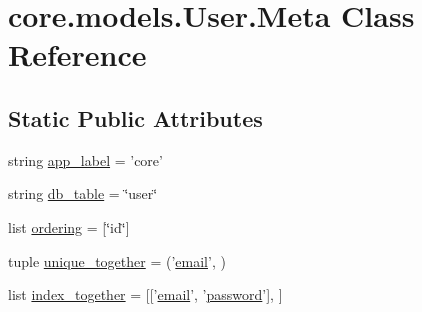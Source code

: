 \hypertarget{classcore_1_1models_1_1User_1_1Meta}{\section{core.\-models.\-User.\-Meta Class Reference}
\label{classcore_1_1models_1_1User_1_1Meta}
}
\subsection*{Static Public Attributes}
\begin{DoxyCompactItemize}
\item 
string \hyperlink{classcore_1_1models_1_1User_1_1Meta_a312a6b6a4a93e43adee50a61c279d86e}{app\-\_\-label} = 'core'
\item 
string \hyperlink{classcore_1_1models_1_1User_1_1Meta_ad3d032af082ac2317f021e5f82d99a73}{db\-\_\-table} = \char`\"{}user\char`\"{}
\item 
list \hyperlink{classcore_1_1models_1_1User_1_1Meta_a1735861228e6e42d23989ddf97d22c60}{ordering} = \mbox{[}\char`\"{}id\char`\"{}\mbox{]}
\item 
tuple \hyperlink{classcore_1_1models_1_1User_1_1Meta_a030339a038db1635e1ba894044e7a4ff}{unique\-\_\-together} = ('\hyperlink{classcore_1_1models_1_1User_a214f7506978bd5f697a493f1b4f83553}{email}', )
\item 
list \hyperlink{classcore_1_1models_1_1User_1_1Meta_af53601dbe2102af20c257ae3f2421ca7}{index\-\_\-together} = \mbox{[}\mbox{[}'\hyperlink{classcore_1_1models_1_1User_a214f7506978bd5f697a493f1b4f83553}{email}', '\hyperlink{classcore_1_1models_1_1User_a7d320bc1c53745b1f8ca4f91e3cc19ea}{password}'\mbox{]}, \mbox{]}
\end{DoxyCompactItemize}



